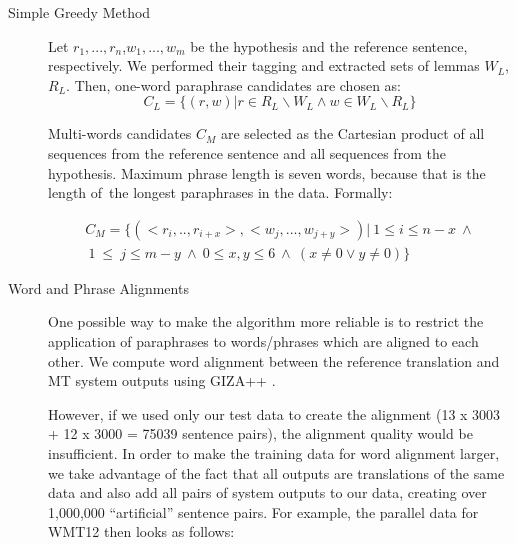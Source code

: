 \documentclass[11pt]{article}
\def\equo#1{``#1''}
\begin{document}
\begin{description}
\item[Simple Greedy Method]
Let $ r_1,..., r_n $,$ w_1,...,w_m $ be the hypothesis and the reference sentence, 
respectively. We performed their tagging and extracted sets of lemmas $ W_{L} $, $ R_{L} $.  
Then, one-word paraphrase candidates are chosen as:
$$ C_{L} = \lbrace (r,w) | r \in R_{L} \smallsetminus W_{L} \wedge w \in W_{L}
\smallsetminus R_{L}  \rbrace $$

Multi-words candidates $ C_M $ are selected as the Cartesian product of all sequences
from the reference sentence and all sequences from the hypothesis. Maximum phrase length 
is seven words, because that is the length of~the longest paraphrases in the data. Formally:

\begin{gather*}
C_{M} = \lbrace (<r_i,..,r_{i+x}>, <w_j,...,w_{j+y}>) | \: 1 \leq i \leq n-x \: \wedge \\ 
 \: 1~\leq~j \leq m-y  \: \wedge \: 0 \leq x,y \leq 6 \: \wedge \: (x \neq 0 \vee y \neq 0) \rbrace 
\end{gather*}
\item[Word and Phrase Alignments]
One possible way to make the algorithm more reliable is to restrict the application of 
paraphrases to words/phrases which are aligned to each other. We compute word alignment 
between the reference translation and MT system outputs using GIZA++ \cite{gizapp}.

However, if we used only our test data to create the alignment (13 x 3003 + 12 x 3000 
= 75039 sentence pairs), the alignment quality would be insufficient. In order to make the 
training data for word alignment larger, we take advantage of the fact that all outputs are 
translations of the same data and also add all pairs of system outputs to our data, creating 
over 1,000,000 \equo{artificial} sentence pairs. For example, the parallel data for WMT12 then 
looks as follows:


\end{description}
\end{document}
